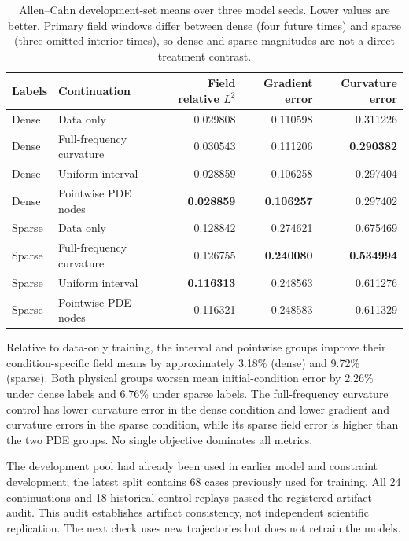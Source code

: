 \documentclass[a4paper,fleqn]{cas-sc}
\begin{document}
\begin{table}
\centering\scriptsize
\caption{Allen--Cahn development-set means over three model seeds. Lower values are better. Primary field windows differ between dense (four future times) and sparse (three omitted interior times), so dense and sparse magnitudes are not a direct treatment contrast.}
\label{tab:allen}
\begin{tabular}{llrrr}
\toprule
Labels & Continuation & Field relative $L^2$ & Gradient error & Curvature error \\
\midrule
Dense & Data only & 0.029808 & 0.110598 & 0.311226 \\
Dense & Full-frequency curvature & 0.030543 & 0.111206 & \textbf{0.290382} \\
Dense & Uniform interval & 0.028859 & 0.106258 & 0.297404 \\
Dense & Pointwise PDE nodes & \textbf{0.028859} & \textbf{0.106257} & 0.297402 \\
\midrule
Sparse & Data only & 0.128842 & 0.274621 & 0.675469 \\
Sparse & Full-frequency curvature & 0.126755 & \textbf{0.240080} & \textbf{0.534994} \\
Sparse & Uniform interval & \textbf{0.116313} & 0.248563 & 0.611276 \\
Sparse & Pointwise PDE nodes & 0.116321 & 0.248583 & 0.611329 \\
\bottomrule
\end{tabular}
\end{table}

Relative to data-only training, the interval and pointwise groups improve their condition-specific field means by approximately 3.18\% (dense) and 9.72\% (sparse). Both physical groups worsen mean initial-condition error by 2.26\% under dense labels and 6.76\% under sparse labels. The full-frequency curvature control has lower curvature error in the dense condition and lower gradient and curvature errors in the sparse condition, while its sparse field error is higher than the two PDE groups. No single objective dominates all metrics.

The development pool had already been used in earlier model and constraint development; the latest split contains 68 cases previously used for training. All 24 continuations and 18 historical control replays passed the registered artifact audit. This audit establishes artifact consistency, not independent scientific replication. The next check uses new trajectories but does not retrain the models.
\end{document}
